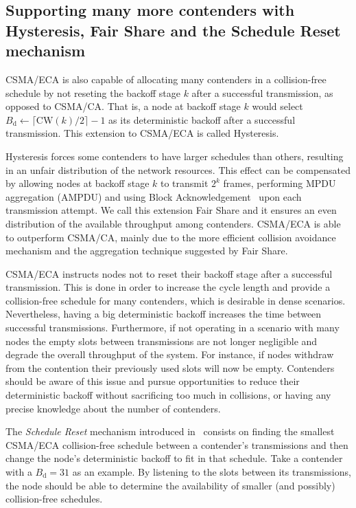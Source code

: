 \documentclass[a4paper]{article}
\begin{document}
\subsection{Supporting many more contenders with Hysteresis, Fair Share and the Schedule Reset mechanism}\label{scheduleReset}

CSMA/ECA is also capable of allocating many contenders in a collision-free schedule by not reseting the backoff stage $k$ after a successful transmission, as opposed to CSMA/CA. That is, a node at backoff stage $k$ would select $B_{\text{d}}\leftarrow \lceil \text{CW}(k)/2\rceil-1$ as its deterministic backoff after a successful transmission. This extension to CSMA/ECA is called Hysteresis. 

Hysteresis forces some contenders to have larger schedules than others, resulting in an unfair distribution of the network resources. This effect can be compensated by allowing nodes at backoff stage $k$ to transmit $2^{k}$ frames, performing MPDU aggregation (AMPDU) and using Block Acknowledgement~\cite{perahia2013next} upon each transmission attempt. We call this extension Fair Share and it ensures an even distribution of the available throughput among contenders. CSMA/ECA is able to outperform CSMA/CA, mainly due to the more efficient collision avoidance mechanism and the aggregation technique suggested by Fair Share.

CSMA/ECA instructs nodes not to reset their backoff stage after a successful transmission. This is done in order to increase the cycle length and provide a collision-free schedule for many contenders, which is desirable in dense scenarios. Nevertheless, having a big deterministic backoff increases the time between successful transmissions. Furthermore, if not operating in a scenario with many nodes the empty slots between transmissions are not longer negligible and degrade the overall throughput of the system. For instance, if nodes withdraw from the contention their previously used slots will now be empty. Contenders should be aware of this issue and pursue opportunities to reduce their deterministic backoff without sacrificing too much in collisions, or having any precise knowledge about the number of contenders. 


The \emph{Schedule Reset} mechanism introduced in~\cite{sanabria2014high} consists on finding the smallest CSMA/ECA collision-free schedule between a contender's transmissions and then change the node's deterministic backoff to fit in that schedule. Take a contender with a $B_{\text{d}}=31$ as an example. By listening to the slots between its transmissions, the node should be able to determine the availability of smaller (and possibly) collision-free schedules. 
\end{document}
